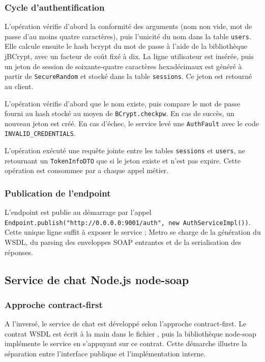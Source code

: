 \subsubsection{Cycle d'authentification}

L'opération  vérifie d'abord la conformité des arguments (nom non vide, mot de passe d'au moins quatre caractères), puis l'unicité du nom dans la table \texttt{users}. Elle calcule ensuite le hash bcrypt du mot de passe à l'aide de la bibliothèque jBCrypt, avec un facteur de coût fixé à dix. La ligne utilisateur est insérée, puis un jeton de session de soixante-quatre caractères hexadécimaux est généré à partir de \texttt{SecureRandom} et stocké dans la table \texttt{sessions}. Ce jeton est retourné au client.

L'opération  vérifie d'abord que le nom existe, puis compare le mot de passe fourni au hash stocké au moyen de \texttt{BCrypt.checkpw}. En cas de succès, un nouveau jeton est créé. En cas d'échec, le service levé une \texttt{AuthFault} avec le code \texttt{INVALID\_CREDENTIALS}.

L'opération  exécuté une requête jointe entre les tables \texttt{sessions} et \texttt{users}, ne retournant un \texttt{TokenInfoDTO} que si le jeton existe et n'est pas expire. Cette opération est consommee par  a chaque appel métier.

\subsubsection{Publication de l'endpoint}

L'endpoint est publie au démarrage par l'appel \texttt{Endpoint.publish("http://0.0.0.0:9001/auth", new AuthServiceImpl())}. Cette unique ligne suffit à exposer le service ; Metro se charge de la génération du WSDL, du parsing des enveloppes SOAP entrantes et de la serialisation des réponses.

\subsection{Service de chat Node.js node-soap}

\subsubsection{Approche contract-first}

A l'inversé, le service de chat est développé selon l'approche contract-first. Le contrat WSDL est écrit à la main dans le fichier , puis la bibliothèque node-soap implémente le service en s'appuyant sur ce contrat. Cette démarche illustre la séparation entre l'interface publique et l'implémentation interne.

